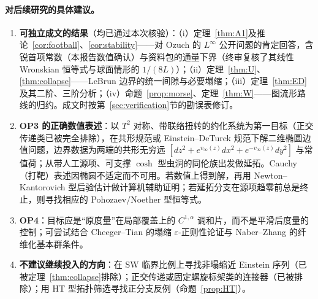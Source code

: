 \paragraph{对后续研究的具体建议。}
\begin{enumerate}
\item \textbf{可独立成文的结果}（均已通过本次核验）：（i）定理~\ref{thm:A1}及推论~\ref{cor:football}、\ref{cor:stability}——对 Ozuch 的 $L^\infty$ 公开问题的肯定回答，含锐首项常数（本报告数值确认）与资料包的通量下界（终审复核了其线性 Wronskian 恒等式与球面情形的 $1/(8L)$）；（ii）定理~\ref{thm:U}、\ref{thm:collapse}——LeBrun 边界的统一间隙与必要塌缩；（iii）定理~\ref{thm:ED}及其二阶、三阶分析；（iv）命题~\ref{prop:morse}、定理~\ref{thm:W}——图流形路线的归约。成文时按第~\ref{sec:verification}节的勘误表修订。
\item \textbf{OP3 的正确数值表述}：以 $T^2$ 对称、带联络扭转的约化系统为第一目标（正交传递类已被完全排除），在共形规范或 Einstein--DeTurck 规范下解二维椭圆边值问题，边界数据为两端的共形无穷远 $[dz^2+e^{v_\infty(z)}dx^2+e^{-v_\infty(z)}dy^2]$ 与常值荷；从带人工源项、可支撑 $\cosh$ 型虫洞的同伦族出发做延拓。Cauchy（打靶）表述因椭圆不适定而不可用。若数值上得到解，再用 Newton--Kantorovich 型后验估计做计算机辅助证明；若延拓分支在源项趋零前总是终止，则寻找相应的 Pohozaev/Noether 型恒等式。
\item \textbf{OP4}：目标应是“原度量”在局部覆盖上的 $C^{1,\alpha}$ 调和片，而不是平滑后度量的控制；可尝试结合 Cheeger--Tian 的塌缩 $\varepsilon$-正则性论证与 Naber--Zhang 的纤维化基本群条件。
\item \textbf{不建议继续投入的方向}：在 SW 临界比例上寻找非塌缩近 Einstein 序列（已被定理~\ref{thm:collapse}排除）；正交传递或固定螺旋标架类的连接器（已被排除）；用 HT 型拓扑筛选寻找正分支反例（命题~\ref{prop:HT}）。
\end{enumerate}
